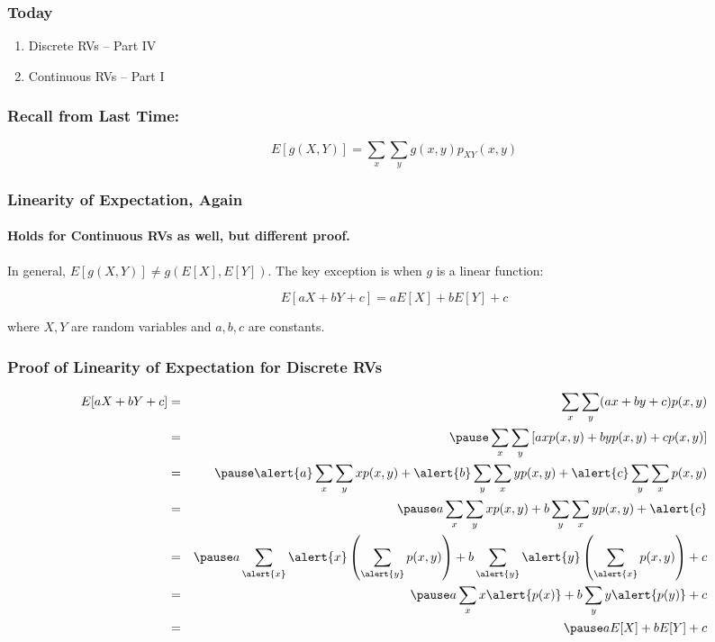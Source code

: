 \documentclass[handout]{beamer}
\date{Lecture \# 9}
\begin{document}
 


\begin{frame}[plain]
	\titlepage 
	

\end{frame} 



\begin{frame}
\frametitle{Today}

\begin{enumerate}
	\item Discrete RVs -- Part IV
	\item Continuous RVs -- Part I
\end{enumerate}

\end{frame}


\begin{frame}
\frametitle{Recall from Last Time:}
\Large
		$$\boxed{E[g(X,Y)] = \sum_x\sum_y g(x,y)p_{XY}(x,y)}$$
\end{frame}


\begin{frame}
\frametitle{Linearity of Expectation, Again}
\framesubtitle{Holds for Continuous RVs as well, but different proof.}
In general, $E[g(X,Y)]\neq g(E[X],E[Y])$. The key exception is when $g$ is a linear function:

\Large
$$\boxed{E[aX + bY + c] = aE[X] + bE[Y] + c}$$

\normalsize
where $X,Y$ are random variables and $a,b,c$ are constants.
\end{frame}
\begin{frame}
\frametitle{Proof of Linearity of Expectation for Discrete RVs}
\footnotesize
\begin{eqnarray*}
	E[aX+bY+c] &=& \sum_x \sum_y (ax+by+c) p(x,y) \\
		&=& \pause \sum_x \sum_y\left[ axp(x,y) + byp(x,y) + cp(x,y)\right]\\
		&=&\pause \alert{a} \sum_x \sum_y xp(x,y) + \alert{b}\sum_y \sum_x y p(x,y) + \alert{c} \sum_y \sum_x  p(x,y) \\
		&=& \pause a \sum_x \sum_y xp(x,y) + b\sum_y \sum_x y p(x,y) + \alert{c}\\
				&=& \pause a \sum_{\alert{x}} \alert{x} \left(\sum_{\alert{y}} p(x,y)\right) + b\sum_{\alert{y}} \alert{y} \left(\sum_{\alert{x}}  p(x,y)\right) + c\\
		&=& \pause a\sum_x x \alert{p(x)} + b\sum_y y  \alert{p(y)}+c\\
		&=& \pause aE[X] + bE[Y] + c
\end{eqnarray*}
\end{frame}
\end{document}
